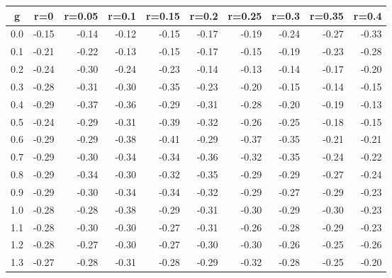 %
\begin{table}[!tbp]
 \begin{center}
 \begin{tabular}{rrrrrrrrrr}\hline\hline
\multicolumn{1}{c}{g}&\multicolumn{1}{c}{r=0}&\multicolumn{1}{c}{r=0.05}&\multicolumn{1}{c}{r=0.1}&\multicolumn{1}{c}{r=0.15}&\multicolumn{1}{c}{r=0.2}&\multicolumn{1}{c}{r=0.25}&\multicolumn{1}{c}{r=0.3}&\multicolumn{1}{c}{r=0.35}&\multicolumn{1}{c}{r=0.4}\tabularnewline
\hline
0.0&-0.15&-0.14&-0.12&-0.15&-0.17&-0.19&-0.24&-0.27&-0.33\tabularnewline
0.1&-0.21&-0.22&-0.13&-0.15&-0.17&-0.15&-0.19&-0.23&-0.28\tabularnewline
0.2&-0.24&-0.30&-0.24&-0.23&-0.14&-0.13&-0.14&-0.17&-0.20\tabularnewline
0.3&-0.28&-0.31&-0.30&-0.35&-0.23&-0.20&-0.15&-0.14&-0.15\tabularnewline
0.4&-0.29&-0.37&-0.36&-0.29&-0.31&-0.28&-0.20&-0.19&-0.13\tabularnewline
0.5&-0.24&-0.29&-0.31&-0.39&-0.32&-0.26&-0.25&-0.18&-0.15\tabularnewline
0.6&-0.29&-0.29&-0.38&-0.41&-0.29&-0.37&-0.35&-0.21&-0.21\tabularnewline
0.7&-0.29&-0.30&-0.34&-0.34&-0.36&-0.32&-0.35&-0.24&-0.22\tabularnewline
0.8&-0.29&-0.34&-0.30&-0.32&-0.35&-0.29&-0.29&-0.27&-0.24\tabularnewline
0.9&-0.29&-0.30&-0.34&-0.34&-0.32&-0.29&-0.27&-0.29&-0.23\tabularnewline
1.0&-0.28&-0.28&-0.38&-0.29&-0.31&-0.30&-0.29&-0.30&-0.23\tabularnewline
1.1&-0.28&-0.30&-0.30&-0.27&-0.31&-0.26&-0.28&-0.29&-0.23\tabularnewline
1.2&-0.28&-0.27&-0.30&-0.27&-0.30&-0.30&-0.26&-0.25&-0.26\tabularnewline
1.3&-0.27&-0.28&-0.31&-0.28&-0.29&-0.32&-0.28&-0.25&-0.20\tabularnewline
\hline
\end{tabular}

\end{center}

\end{table}

